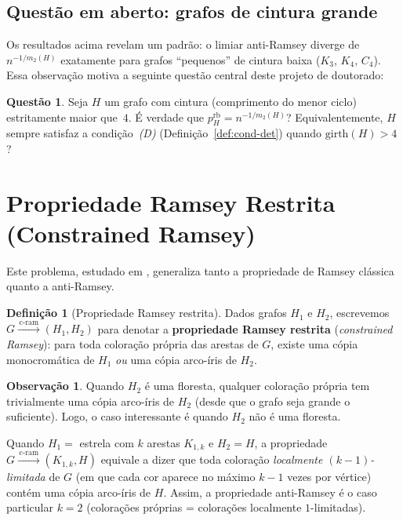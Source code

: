 \documentclass[reqno, 12pt]{amsart}
\numberwithin{equation}{section}
\theoremstyle{plain}
\theoremstyle{definition}
\newtheorem{definition}[theorem]{Definição}
\newtheorem{question}[theorem]{Questão}
\newtheorem{remark}[theorem]{Observação}
\newcommand{\cram}{\xrightarrow{\,\mathrm{c\text{-}ram}\,}}
\newcommand{\mdens}{m_2}
\begin{document}
\subsection{Questão em aberto: grafos de cintura grande}

Os resultados acima revelam um padrão: o limiar anti-Ramsey diverge de
$n^{-1/\mdens(H)}$ exatamente para grafos ``pequenos'' de cintura baixa
($K_3$, $K_4$, $C_4$). Essa observação motiva a seguinte questão central
deste projeto de doutorado:

\begin{question}
\label{q:cintura}
Seja $H$ um grafo com cintura (comprimento do menor ciclo) estritamente maior que~$4$.
É verdade que $p_H^{\mathrm{rb}} = n^{-1/\mdens(H)}$?
Equivalentemente, $H$ sempre satisfaz a condição~\emph{(D)}
(Definição~\ref{def:cond-det}) quando $\mathrm{girth}(H) > 4$?
\end{question}

\section{Propriedade Ramsey Restrita (Constrained Ramsey)} \label{sec:cram}

Este problema, estudado em \cite{behague2025thresholds}, generaliza tanto
a propriedade de Ramsey clássica quanto a anti-Ramsey.

\begin{definition}[Propriedade Ramsey restrita]
\label{def:cram}
Dados grafos $H_1$ e $H_2$, escrevemos $G \cram (H_1, H_2)$ para denotar
a \textbf{propriedade Ramsey restrita} (\emph{constrained Ramsey}):
para toda coloração própria das arestas de $G$,
existe uma cópia monocromática de $H_1$ \emph{ou} uma cópia arco-íris de $H_2$.
\end{definition}

\begin{remark}
Quando $H_2$ é uma floresta, qualquer coloração própria tem trivialmente uma
cópia arco-íris de $H_2$ (desde que o grafo seja grande o suficiente). Logo,
o caso interessante é quando $H_2$ não é uma floresta.

Quando $H_1 = $ estrela com $k$ arestas $K_{1,k}$ e $H_2 = H$, a propriedade
$G \cram (K_{1,k}, H)$ equivale a dizer que toda coloração \emph{localmente
$(k-1)$-limitada} de $G$ (em que cada cor aparece no máximo $k-1$ vezes por vértice)
contém uma cópia arco-íris de $H$. Assim,
a propriedade anti-Ramsey é o caso particular $k = 2$
(colorações próprias = colorações localmente $1$-limitadas).
\end{remark}
\end{document}
